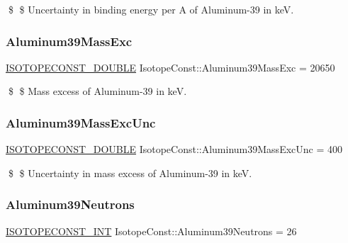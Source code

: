 \$ \$ Uncertainty in binding energy per A of Aluminum-\/39 in keV. \mbox{\label{group___isotope_const-_aluminum-_al39_ga91a05dbc7d305c245fec944e32dd42a6}} 
\subsubsection{\texorpdfstring{Aluminum39\+Mass\+Exc}{Aluminum39MassExc}}
{\footnotesize\ttfamily \mbox{\hyperlink{group___isotope_const-_macros_ga8f45a7272ce02c0b4c65c44636ed719a}{I\+S\+O\+T\+O\+P\+E\+C\+O\+N\+S\+T\+\_\+\+D\+O\+U\+B\+LE}} Isotope\+Const\+::\+Aluminum39\+Mass\+Exc = 20650}

\$ \$ Mass excess of Aluminum-\/39 in keV. \mbox{\label{group___isotope_const-_aluminum-_al39_ga4abdda492be05b5c6a4886a1d2802ef9}} 
\subsubsection{\texorpdfstring{Aluminum39\+Mass\+Exc\+Unc}{Aluminum39MassExcUnc}}
{\footnotesize\ttfamily \mbox{\hyperlink{group___isotope_const-_macros_ga8f45a7272ce02c0b4c65c44636ed719a}{I\+S\+O\+T\+O\+P\+E\+C\+O\+N\+S\+T\+\_\+\+D\+O\+U\+B\+LE}} Isotope\+Const\+::\+Aluminum39\+Mass\+Exc\+Unc = 400}

\$ \$ Uncertainty in mass excess of Aluminum-\/39 in keV. \mbox{\label{group___isotope_const-_aluminum-_al39_ga8f0a9e88d92a0e89e955e4285f1df85c}} 
\subsubsection{\texorpdfstring{Aluminum39\+Neutrons}{Aluminum39Neutrons}}
{\footnotesize\ttfamily \mbox{\hyperlink{group___isotope_const-_macros_ga5f18360b3e99483a35c32d789e62621c}{I\+S\+O\+T\+O\+P\+E\+C\+O\+N\+S\+T\+\_\+\+I\+NT}} Isotope\+Const\+::\+Aluminum39\+Neutrons = 26}


